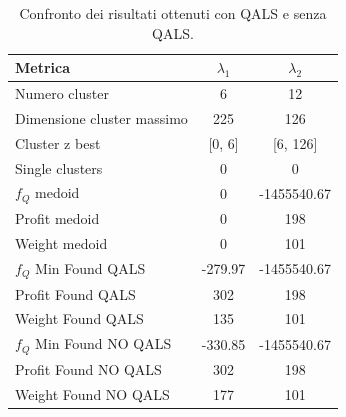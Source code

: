 \documentclass[a4paper,12pt]{article}
\begin{document}
\begin{table}[h]
\centering
\begin{tabular}{lcc}
\hline
\textbf{Metrica} & \(\lambda_1\) & \(\lambda_2\) \\
\hline
Numero cluster & 6 & 12 \\
Dimensione cluster massimo & 225 & 126 \\
Cluster z best & [0, 6] & [6, 126] \\
Single clusters & 0 & 0 \\
\(f_Q\) medoid & 0 & -1455540.67 \\
Profit medoid & 0 & 198 \\
Weight medoid & 0 & 101 \\
\hline
\(f_Q\) Min Found QALS & -279.97 & -1455540.67 \\
Profit Found QALS & 302 & 198 \\
Weight Found QALS & 135 & 101 \\
\hline
\(f_Q\) Min Found NO QALS & -330.85 & -1455540.67 \\
Profit Found NO QALS & 302 & 198 \\
Weight Found NO QALS & 177 & 101 \\
\hline
\end{tabular}

\caption{Confronto dei risultati ottenuti con QALS e senza QALS.}
\label{tab:confronto-qals-noqals}
\end{table}
\end{document}

